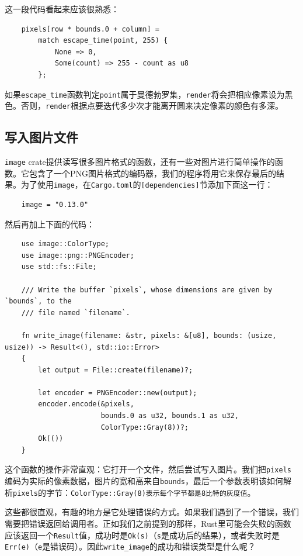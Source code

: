 这一段代码看起来应该很熟悉：
\begin{verbatim}
    pixels[row * bounds.0 + column] =
        match escape_time(point, 255) {
            None => 0,
            Some(count) => 255 - count as u8
        };
\end{verbatim}

如果\texttt{escape\_time}函数判定\texttt{point}属于曼德勃罗集，\texttt{render}将会把相应像素设为黑色。否则，\texttt{render}根据点要迭代多少次才能离开圆来决定像素的颜色有多深。

\subsection{写入图片文件}
\texttt{image} crate提供读写很多图片格式的函数，还有一些对图片进行简单操作的函数。它包含了一个PNG图片格式的编码器，我们的程序将用它来保存最后的结果。为了使用\texttt{image}，在\texttt{Cargo.toml}的\texttt{[dependencies]}节添加下面这一行：
\begin{verbatim}
    image = "0.13.0"
\end{verbatim}

然后再加上下面的代码：
\begin{verbatim}
    use image::ColorType;
    use image::png::PNGEncoder;
    use std::fs::File;

    /// Write the buffer `pixels`, whose dimensions are given by `bounds`, to the
    /// file named `filename`.

    fn write_image(filename: &str, pixels: &[u8], bounds: (usize, usize)) -> Result<(), std::io::Error> 
    {
        let output = File::create(filename)?;

        let encoder = PNGEncoder::new(output);
        encoder.encode(&pixels,
                       bounds.0 as u32, bounds.1 as u32,
                       ColorType::Gray(8))?;
        Ok(())
    }
\end{verbatim}

这个函数的操作非常直观：它打开一个文件，然后尝试写入图片。我们把\texttt{pixels}编码为实际的像素数据，图片的宽和高来自\texttt{bounds}，最后一个参数表明该如何解析\texttt{pixels}的字节：\texttt{ColorType::Gray(8)表示每个字节都是8比特的灰度值}。

这些都很直观，有趣的地方是它处理错误的方式。如果我们遇到了一个错误，我们需要把错误返回给调用者。正如我们之前提到的那样，Rust里可能会失败的函数应该返回一个\texttt{Result}值，成功时是\texttt{Ok(s)}（\texttt{s}是成功后的结果），或者失败时是\texttt{Err(e)}（\texttt{e}是错误码）。因此\texttt{write\_image}的成功和错误类型是什么呢？

